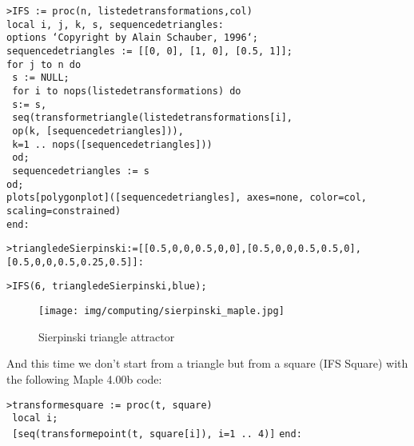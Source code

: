 	\texttt{>IFS := proc(n, liste\textunderscore de\textunderscore transformations,col)}\\
     \texttt{local i, j, k, s, sequence\textunderscore de\textunderscore triangles:}\\
     \texttt{options `Copyright by Alain Schauber, 1996`;}\\
     \texttt{sequence\textunderscore de\textunderscore triangles := [[0, 0], [1, 0], [0.5, 1]];}\\
     \texttt{for j to n do}\\
     \texttt{   s := NULL;}\\   
     \texttt{   for i to nops(liste\textunderscore de\textunderscore transformations) do}\\
        \texttt{   {} {} {} s:= s,}\\
        \texttt{   {} {} {} seq(transforme\textunderscore triangle(liste\textunderscore de\textunderscore transformations[i],}\\
        \texttt{   {} {} {} op(k, [sequence\textunderscore de\textunderscore triangles])),}\\
        \texttt{   {} {} {} k=1 .. nops([sequence\textunderscore de\textunderscore triangles]))}\\
       \texttt{   {} {} {} od;}\\       
      \texttt{   {} {} {} sequence\textunderscore de\textunderscore triangles := s}\\
    \texttt{od;}\\
    \texttt{plots[polygonplot]([sequence\textunderscore de\textunderscore triangles], axes=none, color=col, scaling=constrained)}\\
  	\texttt{end:}
  	
	\texttt{>triangle\textunderscore de\textunderscore  Sierpinski:=[[0.5,0,0,0.5,0,0],[0.5,0,0,0.5,0.5,0], [0.5,0,0,0.5,0.25,0.5]]:}

	\texttt{>IFS(6, triangle\textunderscore de\textunderscore Sierpinski,blue);}
	\begin{figure}[H]
		\centering
		\texttt{[image: img/computing/sierpinski\_maple.jpg]}
		\caption{Sierpinski triangle attractor}
	\end{figure}
	And this time we don't start from a triangle but from a square (IFS Square) with the following Maple 4.00b code:
	
	\texttt{>transforme\textunderscore square := proc(t, square)}\\	
    \texttt{   local i;}\\
    \texttt{   [seq(transforme\textunderscore point(t, square[i]), i=1 .. 4)]}    
	\texttt{end:}\\

